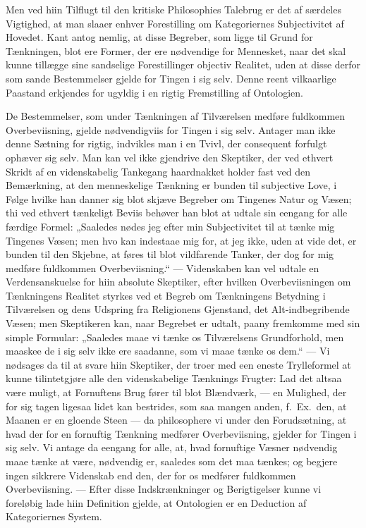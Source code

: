 \documentclass[12pt]{article}
\newcommand{\opage}[1]{\marginnote{\footnotesize\textit{[#1]}}}
\begin{document}
Men ved hiin Tilflugt til den kritiske Philosophies Talebrug er det af særdeles
Vigtighed, at man slaaer enhver Forestilling om Kategoriernes Subjectivitet af
Hovedet. Kant antog nemlig, at disse Begreber, som ligge til Grund for
Tænkningen, blot ere Former, der ere nødvendige for Mennesket, naar det skal
kunne tillægge sine sandselige Forestillinger objectiv Realitet, uden at disse
derfor som sande Bestemmelser gjelde for Tingen i sig selv. Denne reent
vilkaarlige Paastand erkjendes for ugyldig i en rigtig Fremstilling af
Ontologien.

De Bestemmelser, som under Tænkningen af Tilværelsen medføre fuldkommen
Overbeviisning, gjelde nødvendigviis for Tingen i sig selv. Antager man ikke
denne Sætning for rigtig, indvikles man i en Tvivl, der consequent forfulgt
ophæver sig selv. Man kan vel ikke gjendrive den Skeptiker, der ved ethvert
Skridt af en videnskabelig Tankegang haardnakket holder fast ved den Bemærkning,
at den menneskelige Tænkning er bunden til subjective Love, i Følge hvilke han
danner sig blot skjæve Begreber om Tingenes Natur og Væsen; thi ved ethvert
tænkeligt Beviis behøver han blot at udtale sin eengang for alle færdige Formel:
„Saaledes nødes jeg efter min Subjectivitet til at tænke \opage{193}mig Tingenes
Væsen; men hvo kan indestaae mig for, at jeg ikke, uden at vide det, er bunden
til den Skjebne, at føres til blot vildfarende Tanker, der dog for mig medføre
fuldkommen Overbeviisning.“ --- Videnskaben kan vel udtale en Verdensanskuelse
for hiin absolute Skeptiker, efter hvilken Overbeviisningen om Tænkningens
Realitet styrkes ved et Begreb om Tænkningens Betydning i Tilværelsen og dens
Udspring fra Religionens Gjenstand, det Alt-indbegribende Væsen; men Skeptikeren
kan, naar Begrebet er udtalt, paany fremkomme med sin simple Formular:
„Saaledes maae vi tænke os Tilværelsens Grundforhold, men maaskee de i sig selv
ikke ere saadanne, som vi maae tænke os dem.“ --- Vi nødsages da til at svare
hiin Skeptiker, der troer med een eneste Trylleformel at kunne tilintetgjøre
alle den videnskabelige Tænknings Frugter: Lad det altsaa være muligt, at
Fornuftens Brug fører til blot Blændværk, --- en Mulighed, der for sig tagen
ligesaa lidet kan bestrides, som saa mangen anden, f.\ Ex.\ den, at Maanen er en
gloende Steen --- da philosophere vi under den Forudsætning, at hvad der for en
fornuftig Tænkning medfører Overbeviisning, gjelder for Tingen i sig selv. Vi
antage da eengang for alle, at, hvad fornuftige Væsner nødvendig maae tænke at
være, nødvendig er, saaledes som det maa tænkes; og begjere ingen sikkrere
Videnskab end den, der for os medfører fuldkommen Overbeviisning. --- Efter
disse Indskrænkninger og Berigtigelser kunne vi foreløbig lade hiin Definition
gjelde, at Ontologien er en Deduction af Kategoriernes System.
\end{document}
